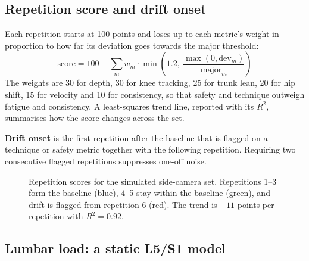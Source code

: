 \documentclass[12pt]{article}
\begin{document}
\subsection{Repetition score and drift onset}

Each repetition starts at 100 points and loses up to each metric's weight in proportion to how far its deviation goes towards the major threshold:
\begin{equation}
\text{score} = 100 - \sum_{m} w_m \cdot \min\!\left(1.2,\ \frac{\max(0, \mathrm{dev}_m)}{\mathrm{major}_m}\right)
\end{equation}
The weights are 30 for depth, 30 for knee tracking, 25 for trunk lean, 20 for hip shift, 15 for velocity and 10 for consistency, so that safety and technique outweigh fatigue and consistency. A least-squares trend line, reported with its $R^2$, summarises how the score changes across the set.

\textbf{Drift onset} is the first repetition after the baseline that is flagged on a technique or safety metric together with the following repetition. Requiring two consecutive flagged repetitions suppresses one-off noise.

\begin{figure}[!htbp]
\centering
{}
\caption{Repetition scores for the simulated side-camera set. Repetitions 1--3 form the baseline (blue), 4--5 stay within the baseline (green), and drift is flagged from repetition 6 (red). The trend is $-11$ points per repetition with $R^2 = 0.92$.}
\end{figure}

\subsection{Lumbar load: a static L5/S1 model}
\end{document}
